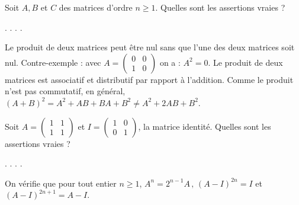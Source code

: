 \begin{question}
Soit $A,B$ et $C$ des matrices d'ordre $n\ge 1$. Quelles sont les assertions vraies ?
\begin{answers}  
.
.
.
.
\end{answers}
\begin{explanations} Le produit de deux matrices peut \^etre nul sans que l'une des deux matrices soit nul. Contre-exemple : avec $A=  
\left(\begin{array}{rc}0&0\\
1&0\end{array}\right)$ on a : $A^2=0$. Le produit de deux matrices est associatif et distributif par rapport à l'addition. Comme le produit n'est pas commutatif, en général, $(A+B)^2=A^2+AB+BA+B^2 \neq A^2+2AB+B^2$.
\end{explanations}
\end{question}
 
\begin{question}
Soit $A=\left(\begin{array}{rc}
1&1\\1&1\end{array}\right) $ et $I=  \left(\begin{array}{rc}
1&0\\0&1\end{array}\right) $, la matrice identité. 
Quelles sont les assertions vraies ?
\begin{answers}  
.
.
.
.
\end{answers}
\begin{explanations} On vérifie que pour tout entier $n\ge 1$,
$A^n=2^{n-1}A\, , \, (A-I)^{2n}= I$ et $(A-I)^{2n+1}= A-I$.
\end{explanations}
\end{question}
       
